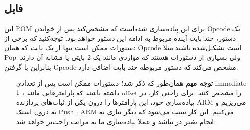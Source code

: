 \subsection*{
	فایل
	}
این ROM برای این پیاده‌سازی شده‌است که مشخص‌کند پس از
خواندن Opcode یک دستور، چند بایت آینده مربوط به ادامه این دستور خواهد بود. توجه‌کنید که برخی از دستورات ممکن است تنها از یک بایت که همان Opcode است تشکیل‌شده باشند مثلا Pop ولی بسیاری از دستورات هستند که مواردی مانند یک 
2 بایتی یا مشابه آن دارند. بنابراین
با گرفتن
Opcode مشخص
می‌کند که دستور مربوطه چند بایت اضافی دارد.
\begin{itemize}
	\item[
	\danger\textbf{توجه مهم}
	]
	همان‌طور که ذکر شد؛ دستورات ممکن است پس از 
	تعدادی immediate داشته باشند که پارامترهایی مانند
	،
	یا offset را مشخص کنند. برای راحتی کار، در پیاده‌سازی خود، این پارامترها را درون یکی از ثبات‌های پردازنده ARM می‌ریزیم و به درون استک Push ، ARM می‌کنیم. این کار سبب می‌شود که دیگر نیازی به انجام تغییر در
	نباشد و عملا پیاده‌سازی ما به مراتب راحت‌تر خواهد شد.
\end{itemize}